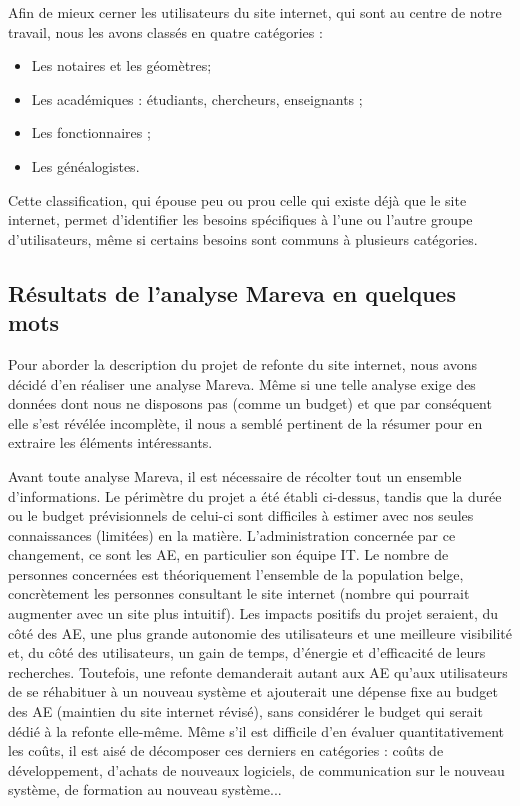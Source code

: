 \documentclass[a4paper,12pt]{article}
\begin{document}
Afin de mieux cerner les utilisateurs du site internet, qui sont au centre de notre travail, nous les avons classés en quatre catégories : 
\begin{itemize}
	\item Les notaires et les géomètres;
	\item Les académiques : étudiants, chercheurs, enseignants ;
	\item Les fonctionnaires ;
	\item Les généalogistes.
\end{itemize}
Cette classification, qui épouse peu ou prou celle qui existe déjà que le site internet, permet d'identifier les besoins spécifiques à l'une ou l'autre groupe d'utilisateurs, même si certains besoins sont communs à plusieurs catégories.

\subsection{Résultats de l'analyse Mareva en quelques mots}

Pour aborder la description du projet de refonte du site internet, nous avons décidé d'en réaliser une analyse Mareva. Même si une telle analyse exige des données dont nous ne disposons pas (comme un budget) et que par conséquent elle s'est révélée incomplète, il nous a semblé pertinent de la résumer pour en extraire les éléments intéressants.

Avant toute analyse Mareva, il est nécessaire de récolter tout un ensemble d'informations. Le périmètre du projet a été établi ci-dessus, tandis que la durée ou le budget prévisionnels de celui-ci sont difficiles à estimer avec nos seules connaissances (limitées) en la matière. L'administration concernée par ce changement, ce sont les AE, en particulier son équipe IT. Le nombre de personnes concernées est théoriquement l'ensemble de la population belge, concrètement les personnes consultant le site internet (nombre qui pourrait augmenter avec un site plus intuitif). Les impacts positifs du projet seraient, du côté des AE, une plus grande autonomie des utilisateurs et une meilleure visibilité et, du côté des utilisateurs, un gain de temps, d'énergie et d'efficacité de leurs recherches. Toutefois, une refonte demanderait autant aux AE qu'aux utilisateurs de se réhabituer à un nouveau système et ajouterait une dépense fixe au budget des AE (maintien du site internet révisé), sans considérer le budget qui serait dédié à la refonte elle-même. Même s'il est difficile d'en évaluer quantitativement les coûts, il est aisé de décomposer ces derniers en catégories : coûts de développement, d'achats de nouveaux logiciels, de communication sur le nouveau système, de formation au nouveau système...
\end{document}
